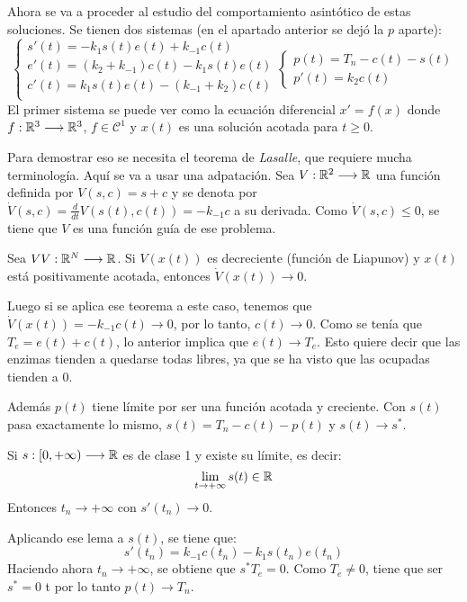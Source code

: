 Ahora se va a proceder al estudio del comportamiento asintótico de estas soluciones. Se tienen dos sistemas (en el apartado anterior se dejó la $p$ aparte):
\[
\left\{
\begin{array}{l}
s'(t)=-k_1s(t)e(t)+k_{-1}c(t)\\
e'(t)=\left(k_2+k_{-1}\right)c(t)-k_1s(t)e(t)\\
c'(t)=k_1s(t)e(t)-\left(k_{-1}+k_2\right)c(t)\\
\end{array}
\right.
\left\{
\begin{array}{l}
p(t)=T_n-c(t)-s(t)\\
p'(t)=k_2c(t)
\end{array}
\right.
\]
El primer sistema se puede ver como la ecuación diferencial $x'=f(x)$ donde $f : \mathbb{R}^3 \longrightarrow \mathbb{R}^3$, $f\in\mathcal{C}^{1}$ y $x(t)$ es una solución acotada para $t\geq 0$.

Para demostrar eso se necesita el teorema de \textit{Lasalle}, que requiere mucha terminología. Aquí se va a usar una adpatación. Sea $V : \mathbb{R}^2 \longrightarrow \mathbb{R}$ una función definida por $V(s,c)=s+c$ y se denota por $\dot{V}(s,c)=\frac{d}{dt}V(s(t),c(t))=-k_{-1}c$ a su derivada. Como $\dot{V}(s,c)\leq 0$, se tiene que $V$ es una función guía de ese problema.
\medskip
\begin{theorem}
Sea $VV : \mathbb{R}^N \longrightarrow \mathbb{R}$. Si $V(x(t))$ es decreciente (función de Liapunov) y $x(t)$ está positivamente acotada, entonces $\dot{V}(x(t))\longrightarrow 0$.
\end{theorem}

Luego si se aplica ese teorema a este caso, tenemos que $\dot{V}(x(t))=-k_{-1}c(t)\longrightarrow 0$, por lo tanto, $c(t)\longrightarrow 0$. Como se tenía que $T_e=e(t)+c(t)$, lo anterior implica que $e(t)\longrightarrow T_e$. Esto quiere decir que las enzimas tienden a quedarse todas libres, ya que se ha visto que las ocupadas tienden a 0. 

Además $p(t)$ tiene límite por ser una función acotada y creciente. Con $s(t)$ pasa exactamente lo mismo, $s(t)=T_n-c(t)-p(t)$ y $s(t)\longrightarrow s^*$.

\begin{lemma}
Si $s : [0,+\infty) \longrightarrow \mathbb{R}$ es de clase 1 y existe su límite, es decir:
\[
\displaystyle\lim_{  t  \to +\infty }  s(t)\in\mathbb{R} 
\]
Entonces $t_n\longrightarrow+\infty$ con $s'(t_n)\longrightarrow 0$.
\end{lemma}

Aplicando ese lema a $s(t)$, se tiene que:
\[
s'(t_n)=k_{-1}c(t_n)-k_1s(t_n)e(t_n)
\]
Haciendo ahora $t_n\longrightarrow +\infty$, se obtiene que $s^*T_e=0$. Como $T_e\neq 0$, tiene que ser $s^*=0$ t por lo tanto $p(t)\longrightarrow T_n$.


